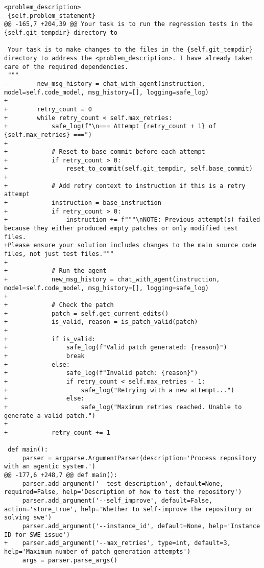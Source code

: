 \begin{lstlisting}[style=diffstyle]
 <problem_description>
 {self.problem_statement}
@@ -165,7 +204,39 @@ Your task is to run the regression tests in the {self.git_tempdir} directory to
 
 Your task is to make changes to the files in the {self.git_tempdir} directory to address the <problem_description>. I have already taken care of the required dependencies.
 """
-        new_msg_history = chat_with_agent(instruction, model=self.code_model, msg_history=[], logging=safe_log)
+
+        retry_count = 0
+        while retry_count < self.max_retries:
+            safe_log(f"\n=== Attempt {retry_count + 1} of {self.max_retries} ===")
+            
+            # Reset to base commit before each attempt
+            if retry_count > 0:
+                reset_to_commit(self.git_tempdir, self.base_commit)
+            
+            # Add retry context to instruction if this is a retry attempt
+            instruction = base_instruction
+            if retry_count > 0:
+                instruction += f"""\nNOTE: Previous attempt(s) failed because they either produced empty patches or only modified test files. 
+Please ensure your solution includes changes to the main source code files, not just test files."""
+
+            # Run the agent
+            new_msg_history = chat_with_agent(instruction, model=self.code_model, msg_history=[], logging=safe_log)
+            
+            # Check the patch
+            patch = self.get_current_edits()
+            is_valid, reason = is_patch_valid(patch)
+            
+            if is_valid:
+                safe_log(f"Valid patch generated: {reason}")
+                break
+            else:
+                safe_log(f"Invalid patch: {reason}")
+                if retry_count < self.max_retries - 1:
+                    safe_log("Retrying with a new attempt...")
+                else:
+                    safe_log("Maximum retries reached. Unable to generate a valid patch.")
+            
+            retry_count += 1
 
 def main():
     parser = argparse.ArgumentParser(description='Process repository with an agentic system.')
@@ -177,6 +248,7 @@ def main():
     parser.add_argument('--test_description', default=None, required=False, help='Description of how to test the repository')
     parser.add_argument('--self_improve', default=False, action='store_true', help='Whether to self-improve the repository or solving swe')
     parser.add_argument('--instance_id', default=None, help='Instance ID for SWE issue')
+    parser.add_argument('--max_retries', type=int, default=3, help='Maximum number of patch generation attempts')
     args = parser.parse_args()
 

\end{lstlisting}
